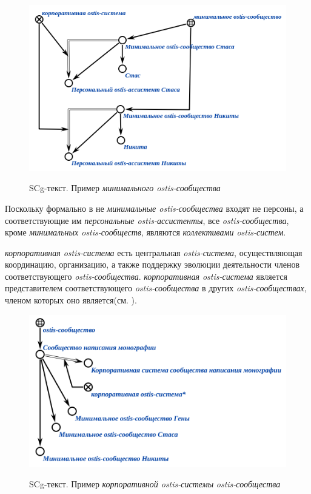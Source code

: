 \begin{figure}[H]
    \caption{SCg-текст. Пример \textit{минимального ostis-сообщества}}
    \includegraphics[scale=0.8]{author/part7/chapter_ecosystem/figures/corporate_ostis_system_example_ru.png}
    \label{fig:ostis_corporate}
\end{figure}

Поскольку формально в не \textit{минимальные ostis-сообщества} входят не персоны, а соответствующие им \textit{персональные ostis-ассистенты}, все \textit{ostis-сообщества}, кроме \textit{минимальных ostis-сообществ}, являются \textit{коллективами ostis-систем}.

\textit{корпоративная ostis-система} есть центральная \textit{ostis-система}, осуществляющая координацию, организацию, а также поддержку эволюции деятельности членов соответствующего \textit{ostis-сообщества}. 
\textit{корпоративная ostis-система} является представителем соответствующего \textit{ostis-сообщества} в других \textit{ostis-сообществах}, членом которых оно является(см. ).

\begin{figure}[H]
    \caption{SCg-текст. Пример \textit{корпоративной ostis-системы} \textit{ostis-сообщества}}
    \includegraphics[scale=0.8]{author/part7/chapter_ecosystem/figures/ostis-system collectivity_example_ru.png}
    \label{fig:ostis_community}
\end{figure}

